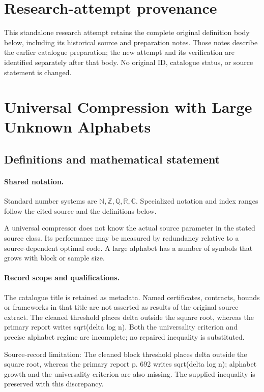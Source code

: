 \documentclass[11pt]{article}
\begin{document}
\section*{Research-attempt provenance}
This standalone research attempt retains the complete original definition body below,
including its historical source and preparation notes. Those notes describe the
earlier catalogue preparation; the new attempt and its verification are identified
separately after that body. No original ID, catalogue status, or source statement is changed.

\section{Universal Compression with Large Unknown Alphabets}\label{statement}

\subsection{Definitions and mathematical statement}

\paragraph{Shared notation.}Standard number systems are $\mathbb N,\mathbb Z,\mathbb Q,\mathbb R,\mathbb C$. Specialized notation and index ranges follow the cited source and the definitions below.


A universal compressor does not know the actual source parameter in the stated source class. Its performance may be measured by redundancy relative to a source-dependent optimal code. A large alphabet has a number of symbols that grows with block or sample size.
\paragraph{Record scope and qualifications.}
The catalogue title is retained as metadata. Named certificates, contracts, bounds or frameworks in that title are not asserted as results of the original source extract.
The cleaned threshold places delta outside the square root, whereas the primary report writes sqrt(delta log n). Both the universality criterion and precise alphabet regime are incomplete; no repaired inequality is substituted.

Source-record limitation: The cleaned block threshold places delta outside the square root, whereas the primary report p. 692 writes sqrt(delta log n); alphabet growth and the universality criterion are also missing. The supplied inequality is preserved with this discrepancy.
\end{document}
